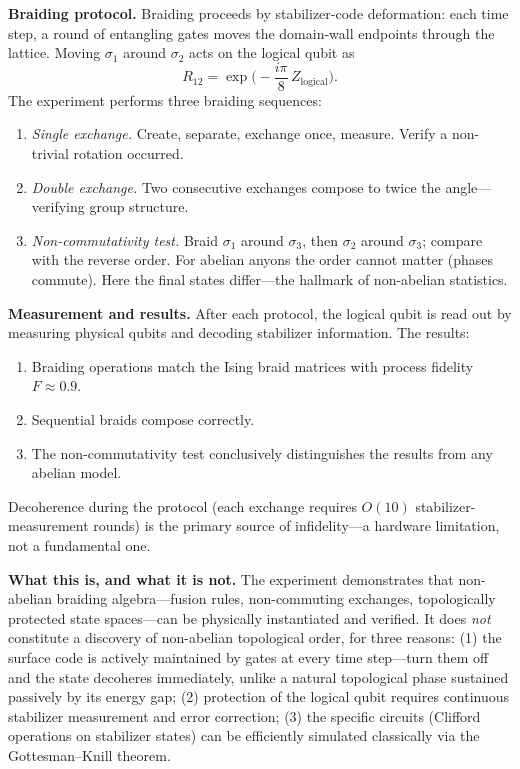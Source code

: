\medskip
\noindent\textbf{Braiding protocol.}
Braiding proceeds by stabilizer-code deformation: each time step, a round of entangling gates moves the domain-wall endpoints through the lattice.  Moving $\sigma_1$ around $\sigma_2$ acts on the logical qubit as
\begin{equation}
  R_{12} = \exp\!\Big(-\frac{i\pi}{8}\,Z_{\mathrm{logical}}\Big).
  \label{eq:andersen-braid-gate}
\end{equation}
The experiment performs three braiding sequences:
\begin{enumerate}
  \item \emph{Single exchange.}  Create, separate, exchange once, measure.  Verify a non-trivial rotation occurred.
  \item \emph{Double exchange.}  Two consecutive exchanges compose to twice the angle---verifying group structure.
  \item \emph{Non-commutativity test.}  Braid $\sigma_1$ around $\sigma_3$, then $\sigma_2$ around $\sigma_3$; compare with the reverse order.  For abelian anyons the order cannot matter (phases commute).  Here the final states differ---the hallmark of non-abelian statistics.
\end{enumerate}

\medskip
\noindent\textbf{Measurement and results.}
After each protocol, the logical qubit is read out by measuring physical qubits and decoding stabilizer information.  The results:
\begin{enumerate}
  \item Braiding operations match the Ising braid matrices with process fidelity $F \approx 0.9$.
  \item Sequential braids compose correctly.
  \item The non-commutativity test conclusively distinguishes the results from any abelian model.
\end{enumerate}
Decoherence during the protocol (each exchange requires $O(10)$ stabilizer-measurement rounds) is the primary source of infidelity---a hardware limitation, not a fundamental one.

\medskip
\noindent\textbf{What this is, and what it is not.}
The experiment demonstrates that non-abelian braiding algebra---fusion rules, non-commuting exchanges, topologically protected state spaces---can be physically instantiated and verified.  It does \emph{not} constitute a discovery of non-abelian topological order, for three reasons: (1) the surface code is actively maintained by gates at every time step---turn them off and the state decoheres immediately, unlike a natural topological phase sustained passively by its energy gap; (2) protection of the logical qubit requires continuous stabilizer measurement and error correction; (3) the specific circuits (Clifford operations on stabilizer states) can be efficiently simulated classically via the Gottesman--Knill theorem.

